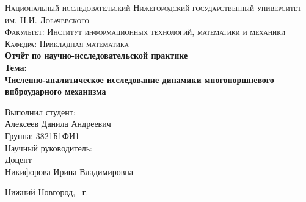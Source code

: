 \begin{titlepage}
    \begin{center}
        \large
        \textsc{Национальный исследовательский Нижегородский государственный университет им. Н.И. Лобачевского}\\[5mm]
        \textsc{Факультет: Институт информационных технологий, математики и механики}\\[2mm]
        \textsc{Кафедра: Прикладная математика}\\[40mm]

        \textbf{\Large Отчёт по научно-исследовательской практике}\\[15mm]
        \textbf{\LARGE Тема:}\\[5mm]
        \textbf{\LARGE Численно-аналитическое исследование динамики многопоршневого виброударного механизма}\\[50mm]

    \end{center}

    \begin{flushright}
        \begin{minipage}{.5\textwidth}
            \large
            Выполнил студент:\\[2mm]
            Алексеев Данила Андреевич\\[1mm]
            Группа: 3821Б1ФИ1\\[5mm]

            Научный руководитель:\\[2mm]
            Доцент\\[1mm]
            Никифорова Ирина Владимировна
        \end{minipage}
    \end{flushright}

    \vfill

    \begin{center}
        \large
        Нижний Новгород, \the\year\ г.
    \end{center}
\end{titlepage}